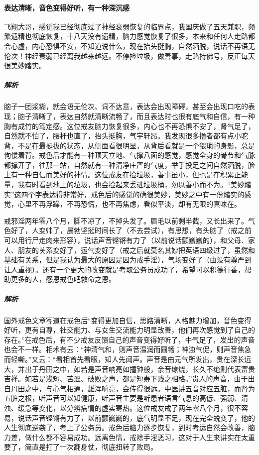 \paragraph{表达清晰，音色变得好听，有一种深沉感}

\begin{case}
    飞翔大哥，感觉我已经彻底过了神经衰弱恢复的临界点，我国庆做了五天兼职，频繁遗精也彻底恢复，十八天没有遗精，脑力感觉恢复了很多，本来和任何人走路都会心虚，内心恐惧不安，不知道说什么，现在抬头挺胸，自然洒脱，说话不再语无伦次！神经衰弱已经离我越来越远。不停捡垃圾，做善事，走路持佛号，反正每天很美妙踏实。
    \subparagraph{解析} 脑子一团浆糊，就会语无伦次、词不达意，表达会出现障碍，甚至会出现口吃的表现；脑子清晰了，表达自然就清晰流畅了，而且表达时也很有底气和自信，有一种胸有成竹的笃定感。这位戒友脑力恢复很多，内心也不再恐惧不安了，肾气足了，自然就不怕了，腰杆也直了，抬头挺胸，气宇轩昂。我发现很多撸者都有点小驼背，不是在最挺拔的状态，从侧面看很明显，从背后看就是一个猥琐的身影，总是佝偻着背。戒色后才能有一种顶天立地、气撑八面的感觉，感觉全身的骨节和气脉都撑开了，往那一站，自然就有一种清净庄严的气度，举手投足之间自然洒脱，脸上有一种自信而美好的神情。这位戒友在捡垃圾，善事虽小，但也是在积累正能量，我有时看到地上的垃圾，也会捡起来丢进垃圾桶，勿以善小而不为。“美妙踏实”这四个字表达得非常好，戒色后的感觉的确很美妙，美妙之中有一份踏实的感觉，心里不再浮躁，不再恐慌，也不再焦虑，看似平淡，却有无限的真味在。
\end{case}

\begin{case}
    戒邪淫两年零八个月，脚不凉了，不掉头发了。眉毛以前剩半截，又长出来了。气色好了，人变帅了，晨勃坚挺时间长了（不去尝试），有思想，有头脑了（戒之前可以用行尸走肉来形容），说话声音铿锵有力了（以前说话颤巍巍的），和父母、家人、朋友的关系变好了，运气变好了（戒之后就莫名其妙把英语四级过了，虽然和基础有关系，但是我认为最大的原因是因为戒手淫），气场变好了（由没有尊严到让人重视）。还有一个更大的改变就是考取公务员成功了，希望可以积德行善，帮助更多的人，感恩戒色吧救命之恩。
    \subparagraph{解析} 国外戒色文章写道在戒色后“变得更加自信，思路清晰，人格魅力增加，音色变得好听，更有自尊，社交能力、与女生交流能力明显改善，他们再次感觉到了自己的存在。”在戒色后，有不少戒友反馈自己的声音变得好听了，中气足了，发出的声音也会不一样。相术有云：“神清气和，则声音温润而圆畅；神浊气促，则声音焦急而轻嘶。”又云：“看相首先看眼，知人先闻声。声音是由元气所发出，贵在深长远大，并出于丹田之中，如若是声音响亮如撞钟般，余音缭绕，长久不绝则代表富贵吉祥。如若是浅短、苦涩、破败之声，都是短寿下贱之相格。”贵人的声音，由于出自丹田之中，与心气相通，雄浑响亮，会传得很远。中医讲五音对应五脏，而肾为五脏之根，听声音可以知健康，听声音主要是听患者语言气息的高低、强弱、清浊、缓急等变化，以分辨病情的虚实寒热。这位戒友戒了两年零八个月，很不容易，说话声音铿锵有力了，以前颤巍巍的，底气明显不足，现在完全蜕变了，他的人生彻底逆袭了，考上了公务员。戒色后脑力逐步恢复，到时考运自然会改善，脑力差，做什么都不容易成功。远离色情，戒除手淫恶习，这对于人生来讲实在太重要了，简直是打了一次翻身仗，彻底扭转了败局。
\end{case}

